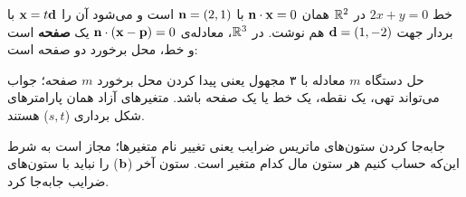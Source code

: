 خط $2x+y=0$ در $\mathbb{R}^2$ همان $\mathbf{n}\cdot\mathbf{x}=0$ با  $\mathbf{n}=(2,1)$ است و می‌شود آن را $\mathbf{x}=t\mathbf{d}$ با بردار جهت $\mathbf{d}=(1,-2)$ هم نوشت. در $\mathbb{R}^3$، معادله‌ی $\mathbf{n}\cdot(\mathbf{x}-\mathbf{p})=0$ یک \textbf{صفحه} است و خط، محل برخورد دو صفحه است:

\begin{center}
\renewcommand{\arraystretch}{1.6}
\end{center}

\begin{intuition}
حل دستگاه $m$ معادله با ۳ مجهول یعنی پیدا کردن محل برخورد $m$ صفحه؛ جواب می‌تواند تهی، یک نقطه، یک خط یا یک صفحه باشد. متغیرهای آزاد همان پارامترهای شکل برداری ($s,t$) هستند.
\end{intuition}

\begin{note}
جابه‌جا کردن ستون‌های ماتریس ضرایب یعنی تغییر نام متغیرها؛ مجاز است به شرط این‌که حساب کنیم هر ستون مال کدام متغیر است. ستون آخر ($\mathbf{b}$) را نباید با ستون‌های ضرایب جابه‌جا کرد.
\end{note}

